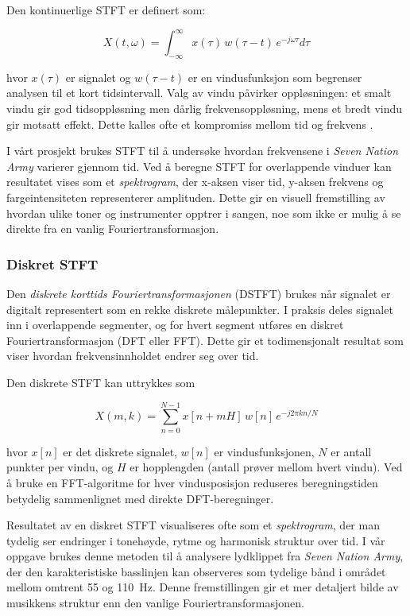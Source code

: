 Den kontinuerlige STFT er definert som:

\begin{equation*}
    X(t,\omega) = \int_{-\infty}^{\infty} x(\tau) \, w(\tau - t) \, e^{-j\omega \tau} d\tau
\end{equation*}

hvor $x(\tau)$ er signalet og $w(\tau - t)$ er en vindusfunksjon som begrenser analysen til et kort tidsintervall. 
Valg av vindu påvirker oppløsningen: et smalt vindu gir god tidsoppløsning men dårlig frekvensoppløsning, 
mens et bredt vindu gir motsatt effekt. Dette kalles ofte et kompromiss mellom tid og frekvens \parencite{geeksforgeeks_fourier}.

I vårt prosjekt brukes STFT til å undersøke hvordan frekvensene i \textit{Seven Nation Army} varierer gjennom tid. 
Ved å beregne STFT for overlappende vinduer kan resultatet vises som et \emph{spektrogram}, 
der x-aksen viser tid, y-aksen frekvens og fargeintensiteten representerer amplituden. 
Dette gir en visuell fremstilling av hvordan ulike toner og instrumenter opptrer i sangen, 
noe som ikke er mulig å se direkte fra en vanlig Fouriertransformasjon.

\subsubsection{Diskret STFT}
Den \emph{diskrete korttids Fouriertransformasjonen} (DSTFT) brukes når signalet er digitalt representert som en rekke diskrete målepunkter. 
I praksis deles signalet inn i overlappende segmenter, og for hvert segment utføres en diskret Fouriertransformasjon (DFT eller FFT). 
Dette gir et todimensjonalt resultat som viser hvordan frekvensinnholdet endrer seg over tid.

Den diskrete STFT kan uttrykkes som

\begin{equation*}
    X(m, k) = \sum_{n=0}^{N-1} x[n + mH] \, w[n] \, e^{-j2\pi kn/N}
\end{equation*}

hvor $x[n]$ er det diskrete signalet, $w[n]$ er vindusfunksjonen, $N$ er antall punkter per vindu, og $H$ er hopplengden (antall prøver mellom hvert vindu). 
Ved å bruke en FFT-algoritme for hver vindusposisjon reduseres beregningstiden betydelig sammenlignet med direkte DFT-beregninger.

Resultatet av en diskret STFT visualiseres ofte som et \emph{spektrogram}, der man tydelig ser endringer i tonehøyde, rytme og harmonisk struktur over tid. 
I vår oppgave brukes denne metoden til å analysere lydklippet fra \textit{Seven Nation Army}, der den karakteristiske basslinjen kan observeres som tydelige 
bånd i området mellom omtrent 55 og 110~Hz. Denne fremstillingen gir et mer detaljert bilde av musikkens struktur enn den vanlige Fouriertransformasjonen.



